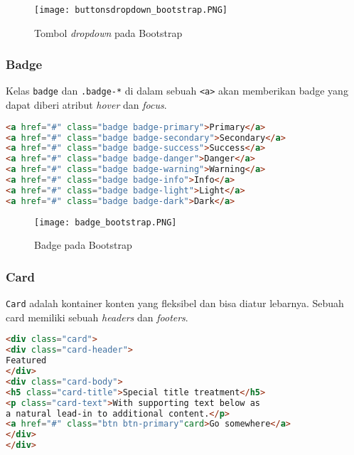 \begin{figure} [H]
	\centering  
	\texttt{[image: buttonsdropdown\_bootstrap.PNG]}  
	\caption{Tombol \textit{dropdown} pada Bootstrap} 
	\label{fig:dropdownBootstrap}
\end{figure}

\subsubsection{Badge}
Kelas \texttt{badge} dan \texttt{.badge-*} di dalam sebuah \texttt{<a>} akan memberikan badge yang dapat diberi atribut \textit{hover} dan \textit{focus}. 
\begin{lstlisting}[language=HTML,  basicstyle=\ttfamily, frame=single, columns=fullflexible, keepspaces=true, breaklines=true, showstringspaces=false, label={lst:badgeBootstrap}, caption=Badge pada bootstrap 4.] 
<a href="#" class="badge badge-primary">Primary</a>
<a href="#" class="badge badge-secondary">Secondary</a>
<a href="#" class="badge badge-success">Success</a>
<a href="#" class="badge badge-danger">Danger</a>
<a href="#" class="badge badge-warning">Warning</a>
<a href="#" class="badge badge-info">Info</a>
<a href="#" class="badge badge-light">Light</a>
<a href="#" class="badge badge-dark">Dark</a>
\end{lstlisting}

\begin{figure} [H]
	\centering  
	\texttt{[image: badge\_bootstrap.PNG]}  
	\caption{Badge pada Bootstrap} 
	\label{fig:badgeBootstrap}
\end{figure}

\subsubsection{Card}
\texttt{Card} adalah kontainer konten yang fleksibel dan bisa diatur lebarnya. Sebuah card memiliki sebuah \textit{headers} dan \textit{footers}.

\begin{lstlisting}[language=HTML,  basicstyle=\ttfamily, frame=single, columns=fullflexible, keepspaces=true, breaklines=true, showstringspaces=false, label={lst:cardBootstrap}, caption=Card pada bootstrap 4.] 
<div class="card">
<div class="card-header">
Featured
</div>
<div class="card-body">
<h5 class="card-title">Special title treatment</h5>
<p class="card-text">With supporting text below as 
a natural lead-in to additional content.</p>
<a href="#" class="btn btn-primary"card>Go somewhere</a>
</div>
</div>
\end{lstlisting}

